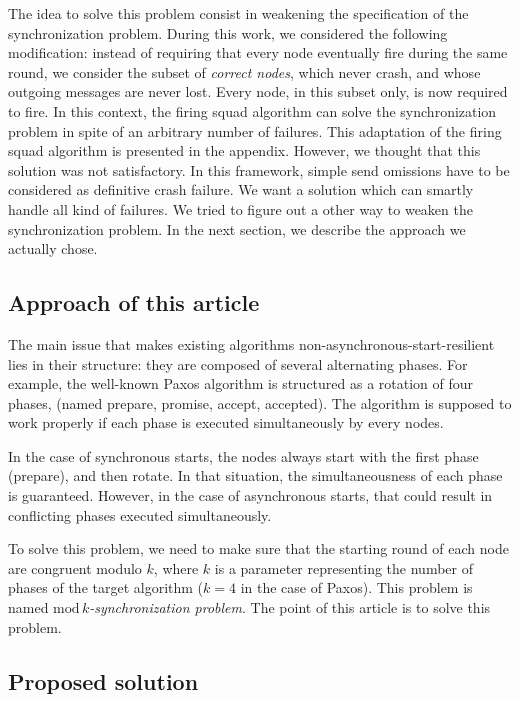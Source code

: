 \documentclass{article}
\begin{document}
The idea to solve this problem consist in weakening the specification of the synchronization problem.
During this work, we considered the following modification:
instead of requiring that every node eventually fire during the same round, we consider the subset of \textit{correct nodes}, which never crash, and whose outgoing messages are never lost.
Every node, in this subset only, is now required to fire.
In this context, the firing squad algorithm can solve the synchronization problem in spite of an arbitrary number of failures.
This adaptation of the firing squad algorithm is presented in the appendix.
However, we thought that this solution was not satisfactory. In this framework, simple send omissions have to be considered as definitive crash failure.
We want a solution which can smartly handle all kind of failures.
We tried to figure out a other way to weaken the synchronization problem.
In the next section, we describe the approach we actually chose.

\subsection{Approach of this article}

The main issue that makes existing algorithms non-asynchronous-start-resilient lies in their structure:
they are composed of several alternating phases.
For example, the well-known Paxos \cite{paxos} algorithm is structured as a rotation of four phases, (named prepare,
promise, accept, accepted).
The algorithm is supposed to work properly if each phase is executed simultaneously by every nodes.

In the case of synchronous starts, the nodes always start with the first phase (prepare), and then rotate.
In that situation, the simultaneousness of each phase is guaranteed.
However, in the case of asynchronous starts, that could result in conflicting phases executed simultaneously.

To solve this problem, we need to make sure that the starting round of each node are congruent modulo $k$,
where $k$ is a parameter representing the number of phases of the target algorithm ($k=4$ in the case of Paxos).
This problem is named \emph{$\mathrm{mod}\,k$-synchronization problem}.
The point of this article is to solve this problem.

\subsection{Proposed solution}
\end{document}
